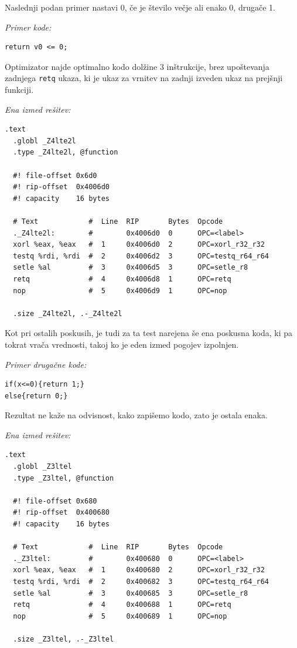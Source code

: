 \documentclass[a4paper, 12pt]{book}
\begin{document}
Naslednji podan primer nastavi 0, če je število večje ali enako 0, drugače 1.
\medskip

\noindent
{\it Primer kode:}
\begin{Verbatim}[baselinestretch=1]
return v0 <= 0;
\end{Verbatim}
Optimizator najde optimalno kodo dolžine 3 inštrukcije, brez upoštevanja zadnjega \texttt{retq} ukaza, ki je ukaz za vrnitev na zadnji izveden ukaz na prejšnji funkciji.
\medskip

\noindent
{\it Ena izmed rešitev:}
\begin{Verbatim}[baselinestretch=1]
  .text
  .globl _Z4lte2l
  .type _Z4lte2l, @function
  
  #! file-offset 0x6d0
  #! rip-offset  0x4006d0
  #! capacity    16 bytes
  
  # Text            #  Line  RIP       Bytes  Opcode             
  ._Z4lte2l:        #        0x4006d0  0      OPC=<label>        
  xorl %eax, %eax   #  1     0x4006d0  2      OPC=xorl_r32_r32   
  testq %rdi, %rdi  #  2     0x4006d2  3      OPC=testq_r64_r64  
  setle %al         #  3     0x4006d5  3      OPC=setle_r8       
  retq              #  4     0x4006d8  1      OPC=retq           
  nop               #  5     0x4006d9  1      OPC=nop                        
  
  .size _Z4lte2l, .-_Z4lte2l
\end{Verbatim}

Kot pri ostalih poskusih, je tudi za ta test narejena še ena poskusna koda, ki pa tokrat vrača vrednosti, takoj ko je eden izmed pogojev izpolnjen.

\medskip

\noindent
{\it Primer drugačne kode:}
\begin{Verbatim}[baselinestretch=1]
if(x<=0){return 1;}
else{return 0;}
\end{Verbatim}
Rezultat ne kaže na odvisnost, kako zapišemo kodo, zato je ostala enaka.
\medskip

\noindent
{\it Ena izmed rešitev:}
\begin{Verbatim}[baselinestretch=1]
  .text
  .globl _Z3ltel
  .type _Z3ltel, @function
  
  #! file-offset 0x680
  #! rip-offset  0x400680
  #! capacity    16 bytes
  
  # Text            #  Line  RIP       Bytes  Opcode             
  ._Z3ltel:         #        0x400680  0      OPC=<label>        
  xorl %eax, %eax   #  1     0x400680  2      OPC=xorl_r32_r32   
  testq %rdi, %rdi  #  2     0x400682  3      OPC=testq_r64_r64  
  setle %al         #  3     0x400685  3      OPC=setle_r8       
  retq              #  4     0x400688  1      OPC=retq           
  nop               #  5     0x400689  1      OPC=nop                      
  
  .size _Z3ltel, .-_Z3ltel
\end{Verbatim}
\end{document}
